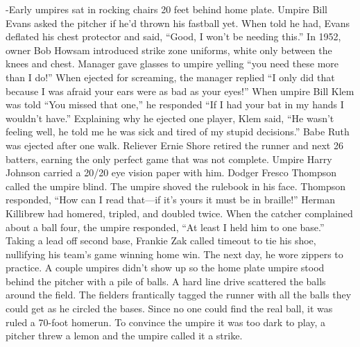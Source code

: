 \documentclass[
]{article}
\begin{document}
-Early umpires sat in rocking chairs 20 feet behind home plate. Umpire
Bill Evans asked the pitcher if he'd thrown his fastball yet. When told
he had, Evans deflated his chest protector and said, ``Good, I won't be
needing this.'' In 1952, owner Bob Howsam introduced strike zone
uniforms, white only between the knees and chest. Manager gave glasses
to umpire yelling ``you need these more than I do!'' When ejected for
screaming, the manager replied ``I only did that because I was afraid
your ears were as bad as your eyes!'' When umpire Bill Klem was told
``You missed that one,'' he responded ``If I had your bat in my hands I
wouldn't have.'' Explaining why he ejected one player, Klem said, ``He
wasn't feeling well, he told me he was sick and tired of my stupid
decisions.'' Babe Ruth was ejected after one walk. Reliever Ernie Shore
retired the runner and next 26 batters, earning the only perfect game
that was not complete. Umpire Harry Johnson carried a 20/20 eye vision
paper with him. Dodger Fresco Thompson called the umpire blind. The
umpire shoved the rulebook in his face. Thompson responded, ``How can I
read that---if it's yours it must be in braille!'' Herman Killibrew had
homered, tripled, and doubled twice. When the catcher complained about a
ball four, the umpire responded, ``At least I held him to one base.''
Taking a lead off second base, Frankie Zak called timeout to tie his
shoe, nullifying his team's game winning home win. The next day, he wore
zippers to practice. A couple umpires didn't show up so the home plate
umpire stood behind the pitcher with a pile of balls. A hard line drive
scattered the balls around the field. The fielders frantically tagged
the runner with all the balls they could get as he circled the bases.
Since no one could find the real ball, it was ruled a 70-foot homerun.
To convince the umpire it was too dark to play, a pitcher threw a lemon
and the umpire called it a strike.
\end{document}

